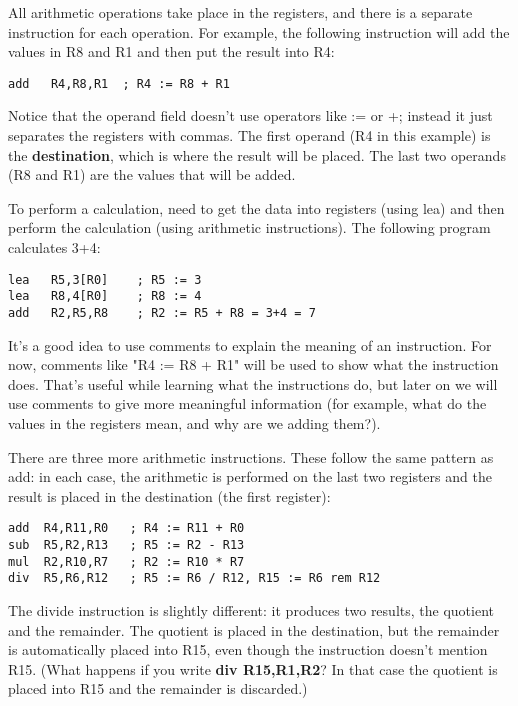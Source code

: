 \documentclass[11pt]{article}
\begin{document}
\begin{itemize}
All arithmetic operations take place in the registers, and there is a
separate instruction for each operation.  For example, the following
instruction will add the values in R8 and R1 and then put the result
into R4:

\begin{verbatim}
add   R4,R8,R1  ; R4 := R8 + R1
\end{verbatim}

Notice that the operand field doesn't use operators like := or +;
instead it just separates the registers with commas.  The first
operand (R4 in this example) is the \textbf{destination}, which is where the
result will be placed.  The last two operands (R8 and R1) are the
values that will be added.

To perform a calculation, need to get the data into registers (using
lea) and then perform the calculation (using arithmetic instructions).
The following program calculates 3+4:

\begin{verbatim}
lea   R5,3[R0]    ; R5 := 3
lea   R8,4[R0]    ; R8 := 4
add   R2,R5,R8    ; R2 := R5 + R8 = 3+4 = 7
\end{verbatim}

It's a good idea to use comments to explain the meaning of an
instruction.  For now, comments like "R4 := R8 + R1" will be used to
show what the instruction does. That's useful while learning what the
instructions do, but later on we will use comments to give more
meaningful information (for example, what do the values in the
registers mean, and why are we adding them?).

There are three more arithmetic instructions.  These follow the same
pattern as add: in each case, the arithmetic is performed on the last
two registers and the result is placed in the destination (the first
register):

\begin{verbatim}
add  R4,R11,R0   ; R4 := R11 + R0
sub  R5,R2,R13   ; R5 := R2 - R13
mul  R2,R10,R7   ; R2 := R10 * R7
div  R5,R6,R12   ; R5 := R6 / R12, R15 := R6 rem R12
\end{verbatim}

The divide instruction is slightly different: it produces two results,
the quotient and the remainder.  The quotient is placed in the
destination, but the remainder is automatically placed into R15, even
though the instruction doesn't mention R15.  (What happens if you
write \textbf{div R15,R1,R2}?  In that case the quotient is placed into R15
and the remainder is discarded.)


\end{itemize}
\end{document}
